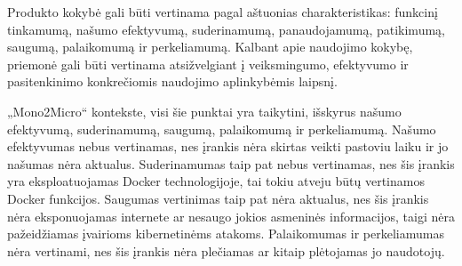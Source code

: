 \documentclass{VUMIFPSbakalaurinis}
\begin{document}
   Produkto kokybė gali būti vertinama pagal aštuonias charakteristikas: funkcinį tinkamumą, našumo efektyvumą, suderinamumą, panaudojamumą, patikimumą, saugumą, palaikomumą ir perkeliamumą. Kalbant apie naudojimo kokybę, priemonė gali būti vertinama atsižvelgiant į veiksmingumo, efektyvumo ir pasitenkinimo konkrečiomis naudojimo aplinkybėmis laipsnį.   
 

„Mono2Micro“ kontekste, visi šie punktai yra taikytini, išskyrus našumo efektyvumą, suderinamumą, saugumą, palaikomumą ir perkeliamumą. Našumo efektyvumas nebus vertinamas, nes įrankis nėra skirtas veikti pastoviu laiku ir jo našumas nėra aktualus. Suderinamumas taip pat nebus vertinamas, nes šis įrankis yra eksploatuojamas Docker technologijoje, tai tokiu atveju būtų vertinamos Docker funkcijos. Saugumas vertinimas taip pat nėra aktualus, nes šis įrankis nėra eksponuojamas internete ar nesaugo jokios asmeninės informacijos, taigi nėra pažeidžiamas įvairioms kibernetinėms atakoms. Palaikomumas ir perkeliamumas nėra vertinami, nes šis įrankis nėra plečiamas ar kitaip plėtojamas jo naudotojų.
\end{document}
